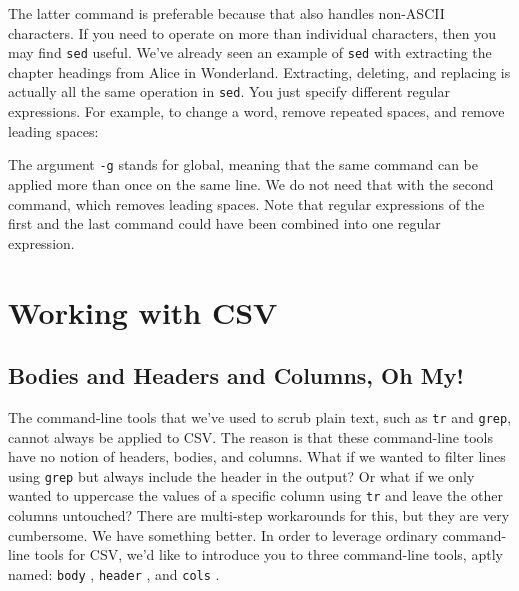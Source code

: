 \documentclass[
]{book}
\newenvironment{Shaded}{\begin{snugshade}}{\end{snugshade}}
\newcommand{\BuiltInTok}[1]{#1}
\newcommand{\ExtensionTok}[1]{#1}
\newcommand{\FunctionTok}[1]{\textcolor[rgb]{0.00,0.00,0.00}{#1}}
\newcommand{\KeywordTok}[1]{\textcolor[rgb]{0.13,0.29,0.53}{\textbf{#1}}}
\newcommand{\NormalTok}[1]{#1}
\newcommand{\StringTok}[1]{\textcolor[rgb]{0.31,0.60,0.02}{#1}}
\theoremstyle{definition}
\theoremstyle{definition}
\theoremstyle{definition}
\theoremstyle{remark}
\begin{document}
The latter command is preferable because that also handles non-ASCII characters. If you need to operate on more than individual characters, then you may find \texttt{sed} useful. We've already seen an example of \texttt{sed} with extracting the chapter headings from Alice in Wonderland. Extracting, deleting, and replacing is actually all the same operation in \texttt{sed}. You just specify different regular expressions. For example, to change a word, remove repeated spaces, and remove leading spaces:

\begin{Shaded}
\end{Shaded}

The argument \texttt{-g} stands for global, meaning that the same command can be applied more than once on the same line. We do not need that with the second command, which removes leading spaces. Note that regular expressions of the first and the last command could have been combined into one regular expression.

\hypertarget{working-with-csv}{%
\section{Working with CSV}\label{working-with-csv}}

\hypertarget{bodies-and-headers-and-columns-oh-my}{%
\subsection{Bodies and Headers and Columns, Oh My!}\label{bodies-and-headers-and-columns-oh-my}}

The command-line tools that we've used to scrub plain text, such as \texttt{tr} and \texttt{grep}, cannot always be applied to CSV. The reason is that these command-line tools have no notion of headers, bodies, and columns. What if we wanted to filter lines using \texttt{grep} but always include the header in the output? Or what if we only wanted to uppercase the values of a specific column using \texttt{tr} and leave the other columns untouched? There are multi-step workarounds for this, but they are very cumbersome. We have something better. In order to leverage ordinary command-line tools for CSV, we'd like to introduce you to three command-line tools, aptly named: \texttt{body} \citep{body}, \texttt{header} \citep{header}, and \texttt{cols} \citep{cols}.
\end{document}
